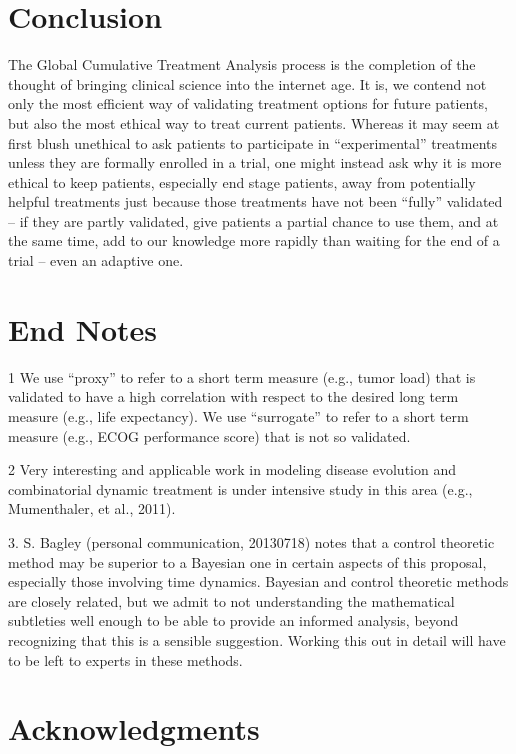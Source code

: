 \documentclass[12pt]{article}
\begin{document}
\section*{Conclusion}

The Global Cumulative Treatment Analysis process is the completion of
the thought of bringing clinical science into the internet age. It is,
we contend not only the most efficient way of validating treatment
options for future patients, but also the most ethical way to treat
current patients. Whereas it may seem at first blush unethical to ask
patients to participate in “experimental” treatments unless they are
formally enrolled in a trial, one might instead ask why it is more
ethical to keep patients, especially end stage patients, away from
potentially helpful treatments just because those treatments have not
been “fully” validated – if they are partly validated, give patients a
partial chance to use them, and at the same time, add to our knowledge
more rapidly than waiting for the end of a trial – even an adaptive
one.

\section*{End Notes}

1 We use “proxy” to refer to a short term measure (e.g., tumor load)
that is validated to have a high correlation with respect to the
desired long term measure (e.g., life expectancy). We use “surrogate”
to refer to a short term measure (e.g., ECOG performance score) that
is not so validated.

2 Very interesting and applicable work in modeling disease evolution
and combinatorial dynamic treatment is under intensive study in this
area (e.g., Mumenthaler, et al., 2011).

3. S. Bagley (personal communication, 20130718) notes that a control
theoretic method may be superior to a Bayesian one in certain aspects
of this proposal, especially those involving time dynamics. Bayesian
and control theoretic methods are closely related, but we admit to not
understanding the mathematical subtleties well enough to be able to
provide an informed analysis, beyond recognizing that this is a
sensible suggestion. Working this out in detail will have to be left
to experts in these methods.

 

\section*{Acknowledgments}
\end{document}
